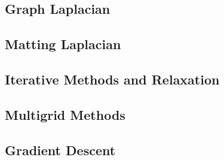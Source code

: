 \subsection{Graph Laplacian}

\subsection{Matting Laplacian}

\subsection{Iterative Methods and Relaxation}

\subsection{Multigrid Methods}
\subsection{Gradient Descent}
